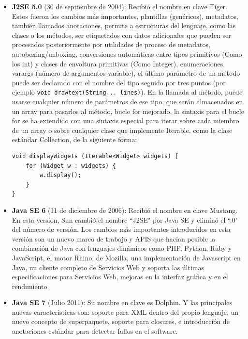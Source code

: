 \begin{itemize}
    \item \textbf{J2SE 5.0} (30 de septiembre de 2004): Recibió el nombre en clave Tiger. Estos fueron los cambios más importantes, plantillas (genéricos), metadatos, también llamados anotaciones, permite a estructuras del lenguaje, como las clases o los métodos, ser etiquetados con datos adicionales que pueden ser procesados posteriormente por utilidades de proceso de metadatos, autoboxing/unboxing, conversiones automáticas entre tipos primitivos (Como los int) y clases de envoltura primitivas (Como Integer), enumeraciones, varargs (número de argumentos variable), el último parámetro de un método puede ser declarado con el nombre del tipo seguido por tres puntos (por ejemplo \lstinline{void drawtext(String... lines)}). En la llamada al método, puede usarse cualquier número de parámetros de ese tipo, que serán almacenados en un array para pasarlos al método, bucle for mejorado, la sintaxis para el bucle for se ha extendido con una sintaxis especial para iterar sobre cada miembro de un array o sobre cualquier clase que implemente Iterable, como la clase estándar Collection, de la siguiente forma:

\begin{lstlisting}[style=Java]
void displayWidgets (Iterable<Widget> widgets) {
	for (Widget w : widgets) {
		w.display();
	}
}
\end{lstlisting}

    \item \textbf{Java SE 6} (11 de diciembre de 2006): Recibió el nombre en clave Mustang. En esta versión, Sun cambió el nombre ``J2SE" por Java SE y eliminó el ``.0" del número de versión. Los cambios más importantes introducidos en esta versión son un nuevo marco de trabajo y APIS que hacían posible la combinación de Java con lenguajes dinámicos como PHP, Python, Ruby y JavaScript, el motor Rhino, de Mozilla, una implementación de Javascript en Java, un cliente completo de Servicios Web y soporta las últimas especificaciones para Servicios Web, mejoras en la interfaz gráfica y en el rendimiento.
    
    \item \textbf{Java SE 7} (Julio 2011): Su nombre en clave es Dolphin. Y las principales nuevas características son: soporte para XML dentro del propio lenguaje, un nuevo concepto de superpaquete, soporte para closures, e introducción de anotaciones estándar para detectar fallos en el software.

\end{itemize}

